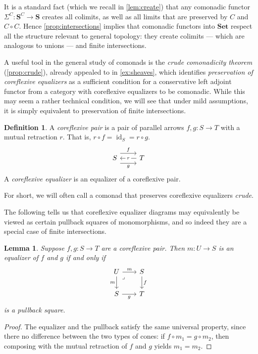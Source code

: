 \documentclass[11pt, oneside, article]{memoir}
\theoremstyle{plain}
\newtheorem{lemma}[theorem]{Lemma}
\theoremstyle{definition}
\newtheorem{definition}[def]{Definition}
\theoremstyle{remark}
\DeclareMathOperator{\id}{id}
\newcommand{\namedcat}[1]{\mathbf{#1}}
\newcommand{\cat}[1]{\mathbf{#1}}
\newcommand{\Set}{\namedcat{Set}}
\newcommand{\CoalgOn}[2]{{#2}^{#1}}
\newcommand{\CoalgS}[1]{\CoalgOn{#1}{\bS}}
\newcommand{\carr}{\Sigma}
\newcommand{\car}[1]{\carr^{#1}}
\newcommand{\carC}{\car{\cC}}
\newcommand{\cmnd}[1]{{#1}}
\newcommand{\xS}{S}
\newcommand{\xT}{T}
\newcommand{\xU}{U}
\newcommand{\cC}{\cmnd{C}}
\newcommand{\bS}{\cat{S}}
\newcommand{\CS}{\CoalgS{\cC}}
\begin{document}
It is a standard fact (which we recall in \cref{lem:create}) that any
comonadic functor $\carC \colon \CS \to \bS$ creates all colimits, as
well as all limits that are preserved by $\cC$ and $\cC \circ
\cC$. Hence \cref{prop:intersections} implies that comonadic functors
into $\Set$ respect all the structure relevant to general topology:
they create colimits --- which are analogous to unions --- and finite
intersections.

A useful tool in the general study of comonads is the \emph{crude
  comonadicity theorem} (\cref{prop:crude}), already appealed to in
\cref{ex:sheaves}, which identifies \emph{preservation of coreflexive
  equalizers} as a sufficient condition for a conservative left
adjoint functor from a category with coreflexive equalizers to be
comonadic. While this may seem a rather technical condition, we will
see that under mild assumptions, it is simply equivalent to
preservation of finite intersections.

\begin{definition}\label{def:crep}
  A \emph{coreflexive pair} is a pair of parallel arrows
  $f, g \colon \xS \to \xT$ with a mutual retraction $r$. That is,
  $r \circ f = \id_\xS = r \circ g$.
  \[\begin{tikzcd}
      \xS & \xT
      \arrow["g"', shift right=3, from=1-1, to=1-2]
      \arrow["f", shift left=3, from=1-1, to=1-2]
      \arrow["r"{description}, from=1-2, to=1-1]
    \end{tikzcd}\]
  A \emph{coreflexive equalizer} is an equalizer of a coreflexive
  pair.
  
  For short, we will often call a comonad that preserves coreflexive
  equalizers \emph{crude}.
\end{definition}

The following tells us that coreflexive equalizer diagrams may
equivalently be viewed as certain pullback squares of monomorphisms,
and so indeed they are a special case of finite intersections.

\begin{lemma}\label{lem:coreflpull}
  Suppose $f, g \colon \xS \to \xT$ are a coreflexive pair. Then
  $m \colon \xU \to \xS$ is an equalizer of $f$ and $g$ if and only if
  \[\begin{tikzcd}[column sep=20pt]
      \xU & \xS \\
      \xS & \xT
      \arrow["m", from=1-1, to=1-2]
      \arrow["m"', from=1-1, to=2-1]
      \arrow["\lrcorner"{anchor=center, pos=0.125}, draw=none, from=1-1, to=2-2]
      \arrow["f", from=1-2, to=2-2]
      \arrow["g"', from=2-1, to=2-2]
    \end{tikzcd}\]
  is a pullback square. 
\end{lemma}
\begin{proof}
  The equalizer and the pullback satisfy the same universal property,
  since there no difference between the two types of cones: if
  $f \circ m_1 = g \circ m_2$, then composing with the mutual
  retraction of $f$ and $g$ yields $m_1 = m_2$.
\end{proof}
\end{document}
